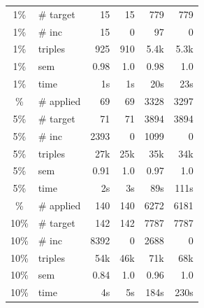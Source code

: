 \documentclass[a4paper,UKenglish,cleveref, autoref, thm-restate]{tgdk-v2021}
\begin{document}
\begin{table}[]
\begin{minipage}[t]{0.49\linewidth}
\begin{tabular}{c l | r r r r}
1\% & \# target & 15 & 15 & 779 & 779 \\
1\% & \# inc & 15 & 0 & 97 & 0 \\
1\% & triples & 925 & 910 & 5.4k & 5.3k \\
1\% & sem & 0.98 & 1.0 & 0.98 & 1.0 \\
1\% & time & 1s & 1s & 20s & 23s \\
\addlinespace
5\% & \# applied & 69 & 69 & 3328 & 3297 \\
5\% & \# target & 71 & 71 & 3894 & 3894 \\
5\% & \# inc & 2393 & 0 & 1099 & 0 \\
5\% & triples & 27k & 25k & 35k & 34k \\
5\% & sem & 0.91 & 1.0 & 0.97 & 1.0 \\
5\% & time & 2s & 3s & 89s & 111s \\
\addlinespace
10\% & \# applied & 140 & 140 & 6272 & 6181 \\
10\% & \# target & 142 & 142 & 7787 & 7787 \\
10\% & \# inc & 8392 & 0 & 2688 & 0 \\
10\% & triples & 54k & 46k & 71k & 68k \\
10\% & sem & 0.84 & 1.0 & 0.96 & 1.0 \\
10\% & time & 4s & 5s & 184s & 230s \\
\bottomrule
\end{tabular}
\end{minipage}%
\end{table}
\end{document}

